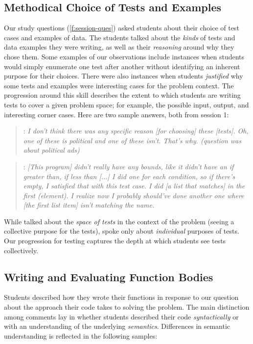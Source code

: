 \subsection*{Methodical Choice of Tests and Examples}

Our study questions (\cref{f:session-ques}) asked students about their
choice of test cases and examples of data. The students talked
about the \emph{kinds} of tests and data examples they were writing, as well as
their \emph{reasoning} around why they chose them. Some examples of our
observations include instances when students would simply enumerate one test
after another without identifying an inherent purpose for their choices. There
were also instances when students \emph{justified} why some tests and examples
were interesting cases for the problem context. The progression around this
skill describes the extent to which students are writing tests to cover a given
problem space; for example, the possible input, output, and interesting
corner cases. Here are two sample answers, both from session 1:

\begin{quote}
\sthree: \textit{I don't think there was any specific reason [for
  choosing] these [tests]. Oh, one of these is political and one of
  these isn't. That's why. (question was about political ads)}
\end{quote}

\begin{quote}
\stwelve: \textit{[This program] didn't really have any bounds, like it didn't have an if greater than, if less than [...] I did one for each condition, so if there's empty, I satisfied that with this test case. I did [a list that matches] in the first (element). I realize now I probably should've done another one where [the first list item] isn't matching the name.}
\end{quote}

While \stwelve talked about the \emph{space of tests} in the context of the
problem (seeing a collective purpose for the tests), \sthree spoke
only about \emph{individual} purposes of tests.  Our progression for testing
captures the depth at which students see tests collectively.

\subsection*{Writing and Evaluating Function Bodies}

Students described how they wrote their functions in response to our
question about the approach their code takes to solving the problem.
The main distinction among comments lay in whether students described
their code \emph{syntactically} or with an understanding of the underlying
\emph{semantics}. Differences in semantic understanding is reflected
in the following samples:

